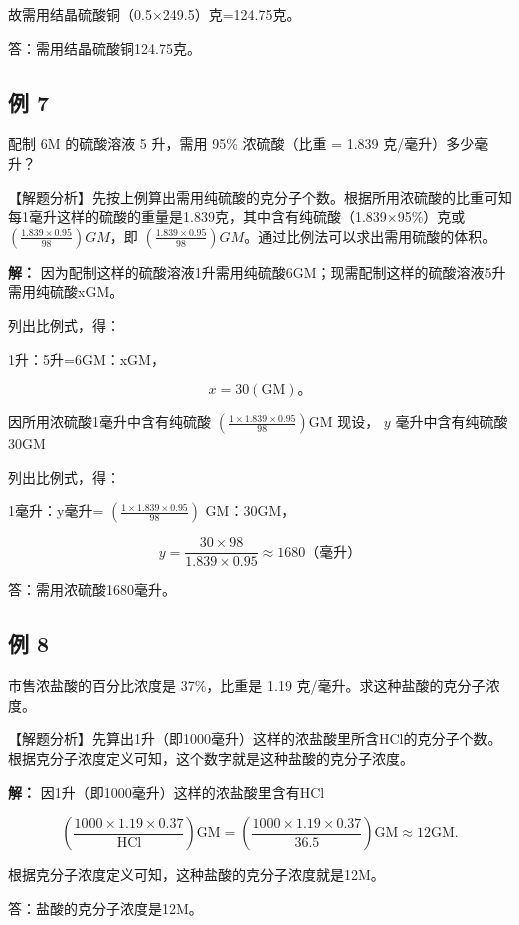 故需用结晶硫酸铜（0.5×249.5）克=124.75克。

答：需用结晶硫酸铜124.75克。

\subsection{例 7}

配制 6M 的硫酸溶液 5 升，需用 95\% 浓硫酸（比重 = 1.839
克/毫升）多少毫升？

【解题分析】先按上例算出需用纯硫酸的克分子个数。根据所用浓硫酸的比重可知每1毫升这样的硫酸的重量是1.839克，其中含有纯硫酸（1.839×95\%）克或
\(\left(\frac{1.839\times0.95}{98}\right)GM\)，即
\(\left(\frac{1.839\times0.95}{98}\right)GM\)。通过比例法可以求出需用硫酸的体积。

\textbf{解：}
因为配制这样的硫酸溶液1升需用纯硫酸6GM；现需配制这样的硫酸溶液5升需用纯硫酸xGM。

列出比例式，得：

1升：5升=6GM：xGM，

\[
x = 30 (\mathrm{GM})\text{。}
\]

因所用浓硫酸1毫升中含有纯硫酸
\(\left(\frac{1\times 1.839\times 0.95}{98}\right)\mathrm{GM}\) 现设，
\(y\) 毫升中含有纯硫酸 \(30\mathrm{GM}\)

列出比例式，得：

1毫升：y毫升= \(\left(\frac{1\times1.839\times0.95}{98}\right)\)
GM：30GM，

\[
y=\frac{30\times98}{1.839\times0.95}\approx1680\text{（毫升）}
\]

答：需用浓硫酸1680毫升。

\subsection{例 8}

市售浓盐酸的百分比浓度是 37\%，比重是 1.19
克/毫升。求这种盐酸的克分子浓度。

【解题分析】先算出1升（即1000毫升）这样的浓盐酸里所含HCl的克分子个数。根据克分子浓度定义可知，这个数字就是这种盐酸的克分子浓度。

\textbf{解：} 因1升（即1000毫升）这样的浓盐酸里含有HCl

\[
\left(\frac {1000 \times 1.19 \times 0.37}{\mathrm{HCl}}\right) \mathrm{GM} = \left(\frac {1000 \times 1.19 \times 0.37}{36.5}\right) \mathrm{GM} \approx 12 \mathrm{GM}.
\]

根据克分子浓度定义可知，这种盐酸的克分子浓度就是12M。

答：盐酸的克分子浓度是12M。


